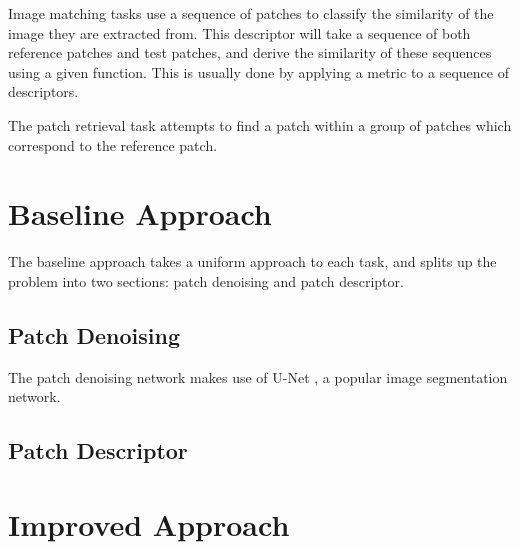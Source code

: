 \documentclass[10pt,twocolumn,letterpaper]{article}
\begin{document}
Image matching tasks use a sequence of patches to classify the similarity of the image they are extracted from. This descriptor will take a sequence of both reference patches and test patches, and derive the similarity of these sequences using a given function. This is usually done by applying a metric to a sequence of descriptors.

The patch retrieval task attempts to find a patch within a group of patches which correspond to the reference patch.

\section{Baseline Approach}
The baseline approach takes a uniform approach to each task, and splits up the problem into two sections: patch denoising and patch descriptor.

\subsection{Patch Denoising}
The patch denoising network makes use of U-Net \cite{RonnebergerFB15}, a popular image segmentation network.

\subsection{Patch Descriptor}

\section{Improved Approach}


{\small


}
\end{document}
